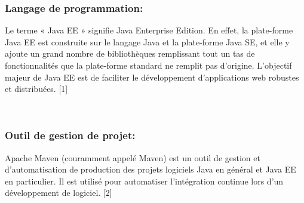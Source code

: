 \documentclass{article}
\begin{document}
{\subsubsection{Langage de programmation: }
\begin{minipage}{0.15\textwidth}
	\begin{minipage}{\linewidth}
	\end{minipage}
\end{minipage}
\hfill
\begin{minipage}{0.75\textwidth}
\vspace{0.5cm}
	Le terme « Java EE » signifie Java Enterprise Edition. En effet, la plate-forme Java EE est construite sur le langage Java et la plate-forme Java SE, et elle y ajoute un grand nombre de bibliothèques remplissant tout un tas de fonctionnalités que la plate-forme standard ne remplit pas d'origine. L'objectif majeur de Java EE est de faciliter le développement d'applications web robustes et distribuées. [1]\\
\end{minipage}\\

\subsubsection{Outil de gestion de projet: }
\begin{minipage}{0.15\textwidth}
	\begin{minipage}{\linewidth}
	\end{minipage}
\end{minipage}
\hfill
\begin{minipage}{0.75\textwidth}
\vspace{0.5cm}
	Apache Maven (couramment appelé Maven) est un outil de gestion et d'automatisation de production des projets logiciels Java en général et Java EE en particulier. Il est utilisé pour automatiser l'intégration continue lors d'un développement de logiciel. [2]\\
\end{minipage}\\


}
\end{document}
